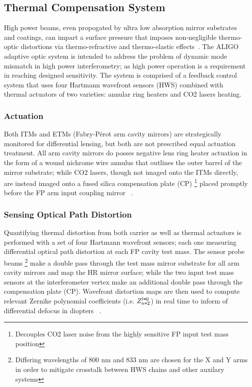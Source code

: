 \subsection{Thermal Compensation System}
High power beams, even propogated by ultra low absorption mirror substrates and coatings, can impart a surface pressure that imposes non-negligible thermo-optic distortions via thermo-refractive and thermo-elastic effects~\cite{hellovinet:1990}. The ALIGO adaptive optic system is intended to address the problem of dynamic mode mismatch in high power interferometry; as high power operation is a requirement in reaching designed sensitivity. The system is comprised of a feedback control system that uses four Hartmann wavefront sensors (HWS) combined with thermal actuators of two varieties: annular ring heaters and CO2 lasers heating.  

\subsubsection{Actuation}
Both ITMs and ETMs (Fabry-P\'{e}rot arm cavity mirrors) are strategically monitored for differential lensing, but both are not prescribed equal actuation treatment. All arm cavity mirrors do posses negative lens ring heater actuation in the form of a wound nichrome wire annulus that outlines the outer barrel of the mirror substrate; while CO2 lasers, though not imaged onto the ITMs directly, are instead imaged onto a fused silica compensation plate (CP) \footnote{Decouples CO2 laser noise from the highly sensitive FP input test mass position} placed promptly before the FP arm input coupling mirror ~\cite{brooks:aigwd2019}.

\subsubsection{Sensing Optical Path Distortion}
Quantifying thermal distortion from both carrier as well as thermal actuators is performed with a set of four Hartmann wavefront sensors; each one measuring differential optical path distortion at each FP cavity test mass. The sensor probe beams \footnote{Differing wavelengths of 800 nm and 833 nm are chosen for the X and Y arms in order to mitigate crosstalk between HWS chains and other auxilary systems} make a double pass through the test mass mirror substrate for all arm cavity mirrors and map the HR mirror surface; while the two input test mass sensors at the interferometer vertex make an additional double pass through the compensation plate (CP). Wavefront distortion maps are then used to compute relevant Zernike polynomial coefficients (i.e. $Z^{l \texttt{=} 0}_{n \texttt{=} 2}$) in real time to inform of differential defocus in diopters ~\cite{aasi:2015}.



